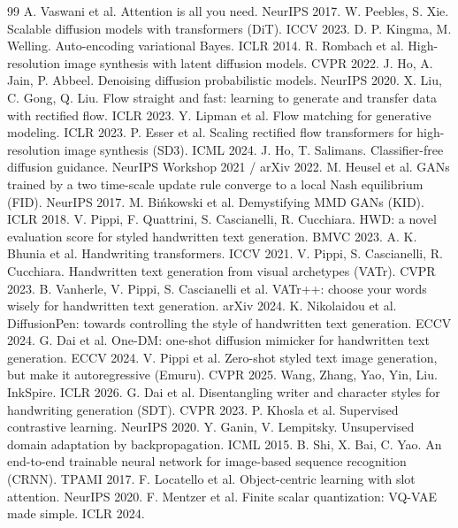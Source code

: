\documentclass[11pt,a4paper]{article}
\begin{document}
\begin{thebibliography}{99}\small
{} A. Vaswani et al. Attention is all you need. NeurIPS 2017.
 W. Peebles, S. Xie. Scalable diffusion models with transformers (DiT). ICCV 2023.
 D. P. Kingma, M. Welling. Auto-encoding variational Bayes. ICLR 2014.
 R. Rombach et al. High-resolution image synthesis with latent diffusion models. CVPR 2022.
 J. Ho, A. Jain, P. Abbeel. Denoising diffusion probabilistic models. NeurIPS 2020.
 X. Liu, C. Gong, Q. Liu. Flow straight and fast: learning to generate and transfer data with rectified flow. ICLR 2023.
 Y. Lipman et al. Flow matching for generative modeling. ICLR 2023.
 P. Esser et al. Scaling rectified flow transformers for high-resolution image synthesis (SD3). ICML 2024.
 J. Ho, T. Salimans. Classifier-free diffusion guidance. NeurIPS Workshop 2021 / arXiv 2022.
 M. Heusel et al. GANs trained by a two time-scale update rule converge to a local Nash equilibrium (FID). NeurIPS 2017.
 M. Bińkowski et al. Demystifying MMD GANs (KID). ICLR 2018.
 V. Pippi, F. Quattrini, S. Cascianelli, R. Cucchiara. HWD: a novel evaluation score for styled handwritten text generation. BMVC 2023.
 A. K. Bhunia et al. Handwriting transformers. ICCV 2021.
 V. Pippi, S. Cascianelli, R. Cucchiara. Handwritten text generation from visual archetypes (VATr). CVPR 2023.
 B. Vanherle, V. Pippi, S. Cascianelli et al. VATr++: choose your words wisely for handwritten text generation. arXiv 2024.
 K. Nikolaidou et al. DiffusionPen: towards controlling the style of handwritten text generation. ECCV 2024.
 G. Dai et al. One-DM: one-shot diffusion mimicker for handwritten text generation. ECCV 2024.
 V. Pippi et al. Zero-shot styled text image generation, but make it autoregressive (Emuru). CVPR 2025.
 Wang, Zhang, Yao, Yin, Liu. InkSpire. ICLR 2026.
 G. Dai et al. Disentangling writer and character styles for handwriting generation (SDT). CVPR 2023.
 P. Khosla et al. Supervised contrastive learning. NeurIPS 2020.
 Y. Ganin, V. Lempitsky. Unsupervised domain adaptation by backpropagation. ICML 2015.
 B. Shi, X. Bai, C. Yao. An end-to-end trainable neural network for image-based sequence recognition (CRNN). TPAMI 2017.
 F. Locatello et al. Object-centric learning with slot attention. NeurIPS 2020.
 F. Mentzer et al. Finite scalar quantization: VQ-VAE made simple. ICLR 2024.
\end{thebibliography}
\end{document}
